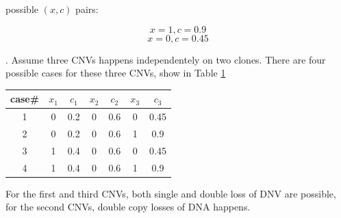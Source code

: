 \documentclass[a4paper]{article}
\begin{document}
possible $(x,c)$ pairs:

\begin{equation*}
x = 1, c = 0.9
\end{equation*}
\begin{equation*}
x = 0, c = 0.45
\end{equation*}

. Assume three CNVs happens independentely on two clones. There are four possible cases for these three CNVs, show in Table \ref{tb:1}

\begin{table}[h]
	\centering
	\begin{tabular}{c|cccccc}
		case\# & $x_1$ & $c_1$ & $x_2$ & $c_2$ & $x_3$ & $c_3$ \\
		\hline
		1 & 0 & 0.2 & 0 & 0.6 & 0 & 0.45 \\
		2 & 0 & 0.2 & 0 & 0.6 & 1 & 0.9 \\
		3 & 1 & 0.4 & 0 & 0.6 & 0 & 0.45 \\
		4 & 1 & 0.4 & 0 & 0.6 & 1 & 0.9 \\
	\end{tabular}
	\label{tb:1}
\end{table}

For the first and third CNVs, both single and double loss of DNV are possible, for the second CNVs, double copy losses of DNA happens.



\end{document}
